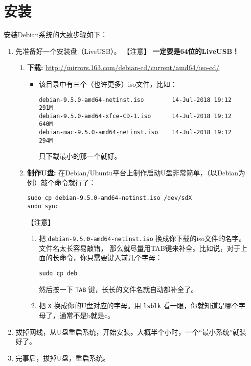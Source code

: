 \documentclass{wx672ctexart}
\begin{document}
\section{安装}
\label{sec:orgbaf76a9}
安装Debian系统的大致步骤如下：
\begin{enumerate}
\item 先准备好一个安装盘（LiveUSB）。 【注意】 \textbf{一定要是64位的LiveUSB！}
\begin{enumerate}
\item \textbf{下载:} \url{http://mirrors.163.com/debian-cd/current/amd64/iso-cd/}
\begin{itemize}
\item 该目录中有三个（也许更多）iso文件，比如：
\begin{verbatim}
debian-9.5.0-amd64-netinst.iso        14-Jul-2018 19:12    291M
debian-9.5.0-amd64-xfce-CD-1.iso      14-Jul-2018 19:12    640M
debian-mac-9.5.0-amd64-netinst.iso    14-Jul-2018 19:12    294M
\end{verbatim}

只下载最小的那一个就好。
\end{itemize}
\item \textbf{制作U盘:} 在Debian/Ubuntu平台上制作启动U盘非常简单，（以Debian为例）敲个命令就行了：
\begin{verbatim}
sudo cp debian-9.5.0-amd64-netinst.iso /dev/sdX
sudo sync
\end{verbatim}
【注意】
\begin{enumerate}
\item 把 \texttt{debian-9.5.0-amd64-netinst.iso} 换成你下载的iso文件的名字。文件名太长容易敲错，
那么就尽量用TAB键来补全。比如说，对于上面的长命令，你只需要键入前几个字母：
\begin{verbatim}
sudo cp deb
\end{verbatim}
然后按一下 \texttt{TAB} 键，长长的文件名就自动都补全了。
\item 把 \texttt{X} 换成你的U盘对应的字母。用 \texttt{lsblk} 看一眼，你就知道是哪个字母了，通常不是b就是c。
\end{enumerate}
\end{enumerate}
\item 拔掉网线，从U盘重启系统，开始安装。大概半个小时，一个“最小系统”就装好了。
\item 完事后，拔掉U盘，重启系统。


\end{enumerate}
\end{document}
